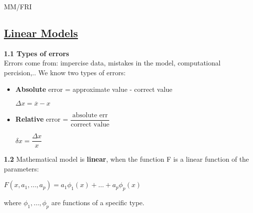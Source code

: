 \documentclass{article}
\begin{document}
\begin{center}
    {\small MM/FRI \par}
\end{center}

\begin{multicols}{3}

\section{\underline{Linear Models}}

\textbf{1.1 Types of errors}\\
Errors come from: impercise data, mistakes in the model, computational percision,..
We know two types of errors:
\begin{itemize}
    \item \textbf{Absolute} error = approximate value - correct value
        \begin{center}
            \begin{math}
                \Delta x = \overline{x} - x
            \end{math}
        \end{center}
    \item \textbf{Relative} error = $\dfrac{\text{absolute err}}{\text{correct value}}$ 
        \begin{center}
            \begin{math}
                \delta x = \dfrac{\Delta x}{x}
            \end{math}
        \end{center}
\end{itemize}

\textbf{1.2} Mathematical model is \textbf{linear},
when the function F is a linear function of the parameters:
\begin{center}
    \begin{math}
        F(x, a_1, \dots, a_p) = a_1 \phi_1(x) + \dots + a_p \phi_p(x) 
    \end{math}
\end{center} 
where $\phi_1, \dots, \phi_p$ are functions of a specific type.



\end{multicols}
\end{document}
